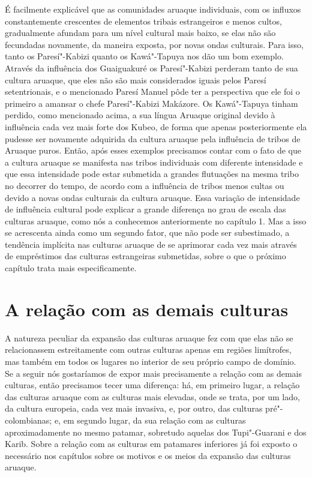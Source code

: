 É facilmente explicável que as comunidades aruaque individuais, com os
influxos constantemente crescentes de elementos tribais estrangeiros e
menos cultos, gradualmente afundam para um nível cultural mais baixo,
se elas não são fecundadas novamente, da maneira exposta, por novas
ondas culturais. Para isso, tanto os Paresí"-Kabizi quanto os
Kawá"-Tapuya nos dão um bom exemplo. Através da influência dos
Guaiguakuré os Paresí"-Kabizi perderam tanto de sua cultura aruaque, que
eles não são mais considerados iguais pelos Paresí setentrionais, e o
mencionado Paresí Manuel pôde ter a perspectiva que ele foi o primeiro a
amansar o chefe Paresí"-Kabizi Makázore. Os Kawá"-Tapuya tinham perdido,
como mencionado acima, a sua língua Aruaque original devido à
influência cada vez mais forte dos Kubeo, de forma que apenas
posteriormente ela pudesse ser novamente adquirida da cultura aruaque
pela influência de tribos de Aruaque puros. Então, após esses exemplos
precisamos contar com o fato de que a cultura aruaque se manifesta nas
tribos individuais com diferente intensidade e que essa intensidade pode
estar submetida a grandes flutuações na mesma tribo no decorrer do
tempo, de acordo com a influência de tribos menos cultas ou devido a
novas ondas culturais da cultura aruaque. Essa variação de intensidade
de influência cultural pode explicar a grande diferença no grau de
escala das culturas aruaque, como nós a conhecemos anteriormente no
capítulo 1. Mas a isso se acrescenta ainda como um segundo fator, que
não pode ser subestimado, a tendência implícita nas culturas aruaque de
se aprimorar cada vez mais através de empréstimos das culturas
estrangeiras submetidas, sobre o que o próximo capítulo trata mais
especificamente.



\chapter*{A relação com as demais culturas\smallskip{}}

A natureza peculiar da expansão das culturas aruaque fez com que elas
não se relacionassem estreitamente com outras culturas apenas em regiões
limítrofes, mas também em todos os lugares no interior de seu próprio
campo de domínio. Se a seguir nós gostaríamos de expor mais
precisamente a relação com as demais culturas, então precisamos tecer
uma diferença: há, em primeiro lugar, a relação das culturas aruaque com
as culturas mais elevadas, onde se trata, por um lado, da cultura
europeia, cada vez mais invasiva, e, por outro, das culturas
pré"-colombianas; e, em segundo lugar, da sua relação com as culturas
aproximadamente no mesmo patamar, sobretudo aquelas dos Tupi"-Guarani e
dos Karib. Sobre a relação com as culturas em patamares inferiores já
foi exposto o necessário nos capítulos sobre os motivos e os meios da
expansão das culturas aruaque.

